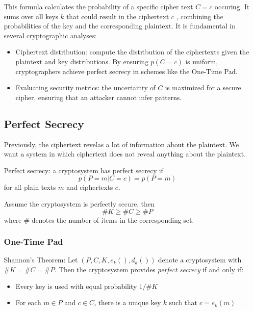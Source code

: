 This formula calculates the probability of a specific cipher text $C = c$ occuring. It sums over all keys $k$ that could result in the ciphertext $c$ , combining the probabilities of the key and the corresponding plaintext. It is fundamental in several cryptographic analyses:
\begin{itemize}
    \item Ciphertext distribution: compute the distribution of the ciphertexts given the plaintext and key distributions. By ensuring $p(C=c)$ is uniform, cryptographers achieve perfect secrecy in schemes like the One-Time Pad.
    \item Evaluating security metrics: the uncertainty of $C$ is maximized for a secure cipher, ensuring that an attacker cannot infer patterns.
\end{itemize}



\subsection{Perfect Secrecy}
Previously, the ciphertext revelas a lot of information about the plaintext. We want a system in which ciphertext does not reveal anything about the plaintext. 

\begin{defn}
    Perfect secrecy: a cryptosystem has perfect secrecy if \[ p(P=m | C=c) = p(P=m) \] for all plain texts $m$ and ciphertexts $c$.
\end{defn}

\begin{lem}
    Assume the cryptosystem is perfectly secure, then 
    \[ \#K \geq \#C \geq \#P\] where $\#$ denotes the number of items in the corresponding set. 
\end{lem}

\subsubsection{One-Time Pad}

\begin{thm}
    Shannon's Theorem: Let $(P, C, K, e_k(), d_k())$ denote a cryptosystem with \( \#K = \#C = \#P\). Then the cryptosystem provides \emph{perfect secrecy} if and only if:
    \begin{itemize}
        \item Every key is used with equal probability $1/\#K$
        \item For each $m \in P$ and $c \in C$, there is a unique key $k$ such that $c = e_k(m)$
    \end{itemize}
\end{thm}

